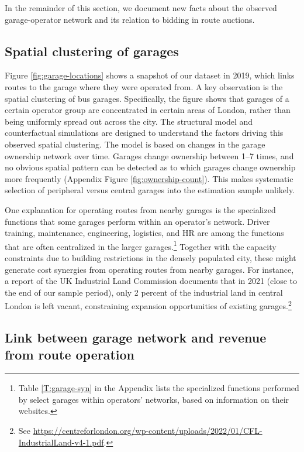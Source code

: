 \documentclass[12pt]{article}
\begin{document}
In the remainder of this section, we document new facts about the observed garage-operator network and its relation to bidding in route auctions.

\subsection{Spatial clustering of garages}
Figure \ref{fig:garage-locations} shows a snapshot of our dataset in 2019, 
which links routes to the garage where they were operated from. A key 
observation is the spatial clustering of bus garages. Specifically, the figure 
shows that garages of a certain operator group are concentrated in certain areas 
of London, rather than being uniformly spread out across the city. The 
structural model and counterfactual simulations are designed to understand the 
factors driving this observed spatial clustering. The model is based on changes 
in the garage ownership network over time. Garages change ownership between 1--7 times, and no obvious spatial pattern 
can be detected as to which garages change ownership more frequently (Appendix Figure \ref{fig:ownership-count}). This 
makes systematic selection of peripheral versus central garages into the 
estimation sample unlikely. 

One explanation for operating routes from nearby garages is the specialized 
functions that some garages perform within an operator's network. Driver 
training, maintenance, engineering, logistics, and HR are among the functions 
that are often centralized in the larger garages.\footnote{Table 
\ref{T:garage-syn} in the Appendix lists the specialized functions performed 
by select garages within operators' networks, based on information on their 
websites.} Together with the capacity constraints due to building restrictions 
in the densely populated city, these might generate cost synergies from 
operating routes from nearby garages. For instance, a report of the UK 
Industrial Land Commission documents that in 2021 (close to the end of our sample period), only 2 percent of the 
industrial land in central London is left vacant, constraining expansion opportunities of existing garages.\footnote{See 
\href{https://centreforlondon.org/wp-content/uploads/2022/01/CFL-IndustrialLand-v4-1.pdf}{https://centreforlondon.org/wp-content/uploads/2022/01/CFL-IndustrialLand-v4-1.pdf}.}


\subsection{Link between garage network and revenue from route operation}\label{S:TfL}
\end{document}
